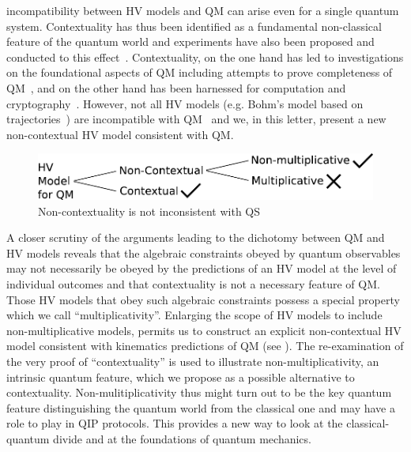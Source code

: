 \documentclass[british,aps,prl,superscriptaddress,nofootinbib,times,reprint]{revtex4-1}
\theoremstyle{plain}
\theoremstyle{plain}
\theoremstyle{definition}
\theoremstyle{remark}
\theoremstyle{remark}
\theoremstyle{remark}
\theoremstyle{plain}
\theoremstyle{plain}
\theoremstyle{plain}
\theoremstyle{definition}
\theoremstyle{definition}
\begin{document}
incompatibility between HV models and QM can arise
even for a single quantum system.  Contextuality
has thus been identified as a fundamental
non-classical feature of the quantum world and
experiments have also been proposed and conducted
to this effect~\cite{SimonContExpProp,
HuangContExp}.
Contextuality, on the one hand has
led to investigations on the foundational aspects
of QM including attempts to prove completeness of
QM~\cite{PawelCntxClsscl,CabelloMmryQM}, and on
the other hand has been harnessed for computation
and
cryptography~\cite{HowardCntxCmptn,CabelloCntxScrt}.
However, not all HV models (e.g.
Bohm's model based on
trajectories~\cite{Bohm1,Bohm2}) are incompatible
with QM~\cite{BellOnHiddenVariables} and we, in
this letter, present a new non-contextual HV model
consistent with QM.
\begin{figure}[h]
\includegraphics[width=0.9\columnwidth]{block1}
\caption{Non-contextuality is not inconsistent
with QS} \label{fig:block}\end{figure}
A closer scrutiny of the arguments
leading to the dichotomy between QM and HV models
reveals that the algebraic constraints obeyed by
quantum observables may not necessarily be obeyed
by the predictions of an HV model at the level of
individual outcomes and  that contextuality is 
not a necessary feature of QM.  Those HV
models that obey such algebraic constraints
possess a special property which we call
``multiplicativity''.  Enlarging the scope of HV
models to include non-multiplicative models,
permits us to construct an explicit non-contextual
HV model consistent with 
kinematics predictions of
QM (see ).
The re-examination of the very proof of
``contextuality''  is used to illustrate
non-multiplicativity, an intrinsic quantum
feature, which we propose as a possible
alternative to contextuality. 
Non-mulitiplicativity thus might turn out to be
the key quantum feature distinguishing the quantum
world from the classical one and may have a role
to play in QIP protocols.  This provides a new
way to look at the classical-quantum divide and at
the foundations of quantum mechanics. 
\end{document}

